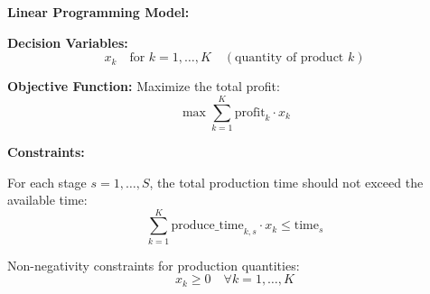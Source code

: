 \documentclass{article}
\begin{document}
\textbf{Linear Programming Model:}

\textbf{Decision Variables:}
\[
x_k \quad \text{for } k = 1, \ldots, K \quad (\text{quantity of product } k)
\]

\textbf{Objective Function:}
Maximize the total profit:
\[
\max \sum_{k=1}^{K} \text{profit}_k \cdot x_k
\]

\textbf{Constraints:}

For each stage \( s = 1, \ldots, S \), the total production time should not exceed the available time:
\[
\sum_{k=1}^{K} \text{produce\_time}_{k,s} \cdot x_k \leq \text{time}_s
\]

Non-negativity constraints for production quantities:
\[
x_k \geq 0 \quad \forall k = 1, \ldots, K
\]
\end{document}
